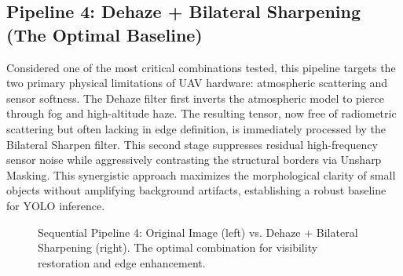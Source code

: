 \subsection{Pipeline 4: Dehaze + Bilateral Sharpening (The Optimal Baseline)}
Considered one of the most critical combinations tested, this pipeline targets the two primary physical limitations of UAV hardware: atmospheric scattering and sensor softness. The Dehaze filter first inverts the atmospheric model to pierce through fog and high-altitude haze. The resulting tensor, now free of radiometric scattering but often lacking in edge definition, is immediately processed by the Bilateral Sharpen filter. This second stage suppresses residual high-frequency sensor noise while aggressively contrasting the structural borders via Unsharp Masking. This synergistic approach maximizes the morphological clarity of small objects without amplifying background artifacts, establishing a robust baseline for YOLO inference.

\begin{figure}[hbt!]
    \centering
    \caption{Sequential Pipeline 4: Original Image (left) vs. Dehaze + Bilateral Sharpening (right). The optimal combination for visibility restoration and edge enhancement.}
    \label{fig:pipeline_dehaze_sharp}
\end{figure}
